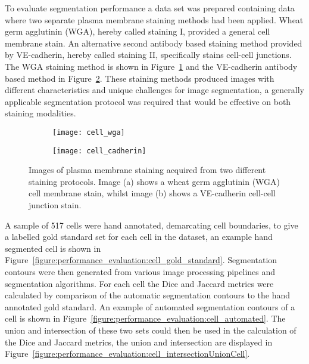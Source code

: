 To evaluate segmentation performance a data set was prepared containing data where two separate plasma membrane staining methods had been applied. Wheat germ agglutinin (WGA), hereby called staining I, provided a general cell membrane stain. An alternative second antibody based staining method provided by VE-cadherin, hereby called staining II, specifically stains cell-cell junctions. The WGA staining method is shown in Figure~\ref{figure:performance_evaluation:staining_1} and the VE-cadherin antibody based method in Figure~\ref{figure:performance_evaluation:staining_2}. These staining methods produced images with different characteristics and unique challenges for image segmentation, a generally applicable segmentation protocol was required that would be effective on both staining modalities.

\begin{figure}[htbp]\centering
	\begin{subfigure}[b]{0.49\linewidth}
		\centering
		\texttt{[image: cell\_wga]}
		\caption{}
		\label{figure:performance_evaluation:staining_1}
		\vspace{1ex}
	\end{subfigure}
	\begin{subfigure}[b]{0.49\linewidth}
		\centering
		\texttt{[image: cell\_cadherin]}
		\caption{}
		\label{figure:performance_evaluation:staining_2}
		\vspace{1ex}
	\end{subfigure}
\caption[Cell staining protocols]{Images of plasma membrane staining acquired from two different staining protocols. Image (a) shows a wheat germ agglutinin (WGA) cell membrane stain, whilst image (b) shows a VE-cadherin cell-cell junction stain.}
\label{figure:performance_evaluation:staining}
\end{figure}

A sample of 517 cells were hand annotated, demarcating cell boundaries, to give a labelled gold standard set for each cell in the dataset, an example hand segmented cell is shown in Figure~\ref{figure:performance_evaluation:cell_gold_standard}. Segmentation contours were then generated from various image processing pipelines and segmentation algorithms. For each cell the Dice and Jaccard metrics were calculated by comparison of the automatic segmentation contours to the hand annotated gold standard. An example of automated segmentation contours of a cell is shown in Figure~\ref{figure:performance_evaluation:cell_automated}. The union and intersection of these two sets could then be used in the calculation of the Dice and Jaccard metrics, the union and intersection are displayed in Figure~\ref{figure:performance_evaluation:cell_intersectionUnionCell}.

